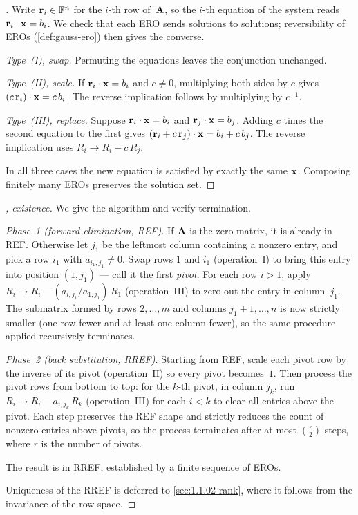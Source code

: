 \begin{proof}[]
Write $\mathbf{r}_i \in \mathbb{F}^n$ for the $i$-th row of~$\mathbf{A}$, so the
$i$-th equation of the system reads $\mathbf{r}_i \cdot \mathbf{x} = b_i$.
We check that each ERO sends solutions to solutions; reversibility of
EROs (\cref{def:gauss-ero}) then gives the converse.

\emph{Type~(I), swap.} Permuting the equations leaves the conjunction
unchanged.

\emph{Type~(II), scale.} If $\mathbf{r}_i \cdot \mathbf{x} = b_i$ and
$c \neq 0$, multiplying both sides by $c$ gives
$(c\,\mathbf{r}_i) \cdot \mathbf{x} = c\,b_i$. The reverse implication
follows by multiplying by $c^{-1}$.

\emph{Type~(III), replace.} Suppose $\mathbf{r}_i \cdot \mathbf{x} = b_i$
and $\mathbf{r}_j \cdot \mathbf{x} = b_j$. Adding $c$ times the second
equation to the first gives
$(\mathbf{r}_i + c\,\mathbf{r}_j) \cdot \mathbf{x} = b_i + c\,b_j$. The
reverse implication uses $R_i \to R_i - c\,R_j$.

In all three cases the new equation is satisfied by exactly the same
$\mathbf{x}$. Composing finitely many EROs preserves the solution set.
\end{proof}

\begin{proof}[, existence]
We give the algorithm and verify termination.

\emph{Phase~1 (forward elimination, REF).} If $\mathbf{A}$ is the zero
matrix, it is already in REF. Otherwise let $j_1$ be the leftmost
column containing a nonzero entry, and pick a row $i_1$ with
$a_{i_1, j_1} \neq 0$. Swap rows $1$ and $i_1$ (operation~I) to bring
this entry into position $(1, j_1)$ — call it the first \emph{pivot}.
For each row $i > 1$, apply
$R_i \to R_i - (a_{i, j_1}/a_{1, j_1})\,R_1$ (operation~III) to zero out
the entry in column~$j_1$. The submatrix formed by rows $2, \dots, m$
and columns $j_1 + 1, \dots, n$ is now strictly smaller (one row fewer
and at least one column fewer), so the same procedure applied
recursively terminates.

\emph{Phase~2 (back substitution, RREF).} Starting from REF, scale each
pivot row by the inverse of its pivot (operation~II) so every pivot
becomes~$1$. Then process the pivot rows from bottom to top: for the
$k$-th pivot, in column $j_k$, run $R_i \to R_i - a_{i, j_k}\,R_k$
(operation~III) for each $i < k$ to clear all entries above the pivot.
Each step preserves the REF shape and strictly reduces the count of
nonzero entries above pivots, so the process terminates after at most
$\binom{r}{2}$ steps, where $r$ is the number of pivots.

The result is in RREF, established by a finite sequence of EROs.

Uniqueness of the RREF is deferred to \cref{sec:1.1.02-rank}, where
it follows from the invariance of the row space.
\end{proof}

